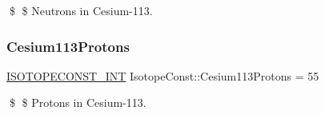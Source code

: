 \$ \$ Neutrons in Cesium-\/113. \mbox{\label{group___isotope_const-_cesium-_cs113_gaca49d9887ea175764d5169cbed28e2eb}} 
\subsubsection{\texorpdfstring{Cesium113\+Protons}{Cesium113Protons}}
{\footnotesize\ttfamily \mbox{\hyperlink{group___isotope_const-_macros_ga5f18360b3e99483a35c32d789e62621c}{I\+S\+O\+T\+O\+P\+E\+C\+O\+N\+S\+T\+\_\+\+I\+NT}} Isotope\+Const\+::\+Cesium113\+Protons = 55}

\$ \$ Protons in Cesium-\/113. 
